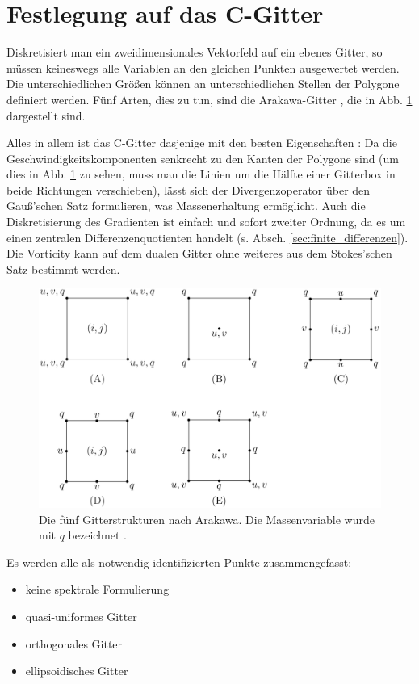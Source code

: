 \documentclass{book}
\begin{document}
\section{Festlegung auf das C-Gitter}
\label{sec:festlegung_auf_das_cgitter}

Diskretisiert man ein zweidimensionales Vektorfeld auf ein ebenes Gitter, so müssen keineswegs alle Variablen an den gleichen Punkten ausgewertet werden. Die unterschiedlichen Größen können an unterschiedlichen Stellen der Polygone definiert werden. Fünf Arten, dies zu tun, sind die Arakawa-Gitter \cite{arakawa}, die in Abb. \ref{fig:arakawa} dargestellt sind.

Alles in allem ist das C-Gitter dasjenige mit den besten Eigenschaften \cite{staniforth_grids}: Da die Geschwindigkeitskomponenten senkrecht zu den Kanten der Polygone sind (um dies in Abb. \ref{fig:arakawa} zu sehen, muss man die Linien um die Hälfte einer Gitterbox in beide Richtungen verschieben), lässt sich der Divergenzoperator über den Gauß'schen Satz formulieren, was Massenerhaltung ermöglicht. Auch die Diskretisierung des Gradienten ist einfach und sofort zweiter Ordnung, da es um einen zentralen Differenzenquotienten handelt (s. Absch. \ref{sec:finite_differenzen}). Die Vorticity kann auf dem dualen Gitter ohne weiteres aus dem Stokes'schen Satz bestimmt werden.

\begin{figure}
\centering
\includegraphics[width = .6\textwidth]{figs/arakawa.png}
\caption{Die fünf Gitterstrukturen nach Arakawa. Die Massenvariable wurde mit $q$ bezeichnet \cite{arakawa_grids_figure}.}
\label{fig:arakawa}
\end{figure}
%
Es werden alle als notwendig identifizierten Punkte zusammengefasst:
%
\begin{itemize}
\item keine spektrale Formulierung
\item quasi-uniformes Gitter
\item orthogonales Gitter
\item ellipsoidisches Gitter
\end{itemize}
\end{document}
